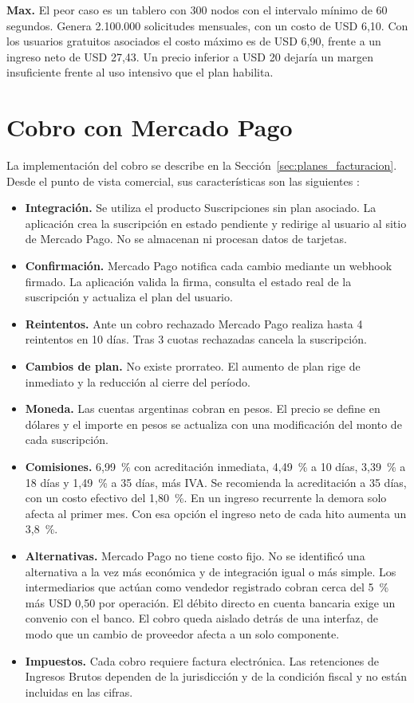 \textbf{Max.} El peor caso es un tablero con 300 nodos con el intervalo mínimo de 60 segundos. Genera 2.100.000 solicitudes mensuales, con un costo de USD 6,10. Con los usuarios gratuitos asociados el costo máximo es de USD 6,90, frente a un ingreso neto de USD 27,43. Un precio inferior a USD 20 dejaría un margen insuficiente frente al uso intensivo que el plan habilita.

\section{Cobro con Mercado Pago}
\label{sec:cobro_mp}
La implementación del cobro se describe en la Sección~\ref{sec:planes_facturacion}. Desde el punto de vista comercial, sus características son las siguientes \cite{mercadopago_docs, mercadopago_costos}:

\begin{itemize}
  \item \textbf{Integración.} Se utiliza el producto Suscripciones sin plan asociado. La aplicación crea la suscripción en estado pendiente y redirige al usuario al sitio de Mercado Pago. No se almacenan ni procesan datos de tarjetas.
  \item \textbf{Confirmación.} Mercado Pago notifica cada cambio mediante un webhook firmado. La aplicación valida la firma, consulta el estado real de la suscripción y actualiza el plan del usuario.
  \item \textbf{Reintentos.} Ante un cobro rechazado Mercado Pago realiza hasta 4 reintentos en 10 días. Tras 3 cuotas rechazadas cancela la suscripción.
  \item \textbf{Cambios de plan.} No existe prorrateo. El aumento de plan rige de inmediato y la reducción al cierre del período.
  \item \textbf{Moneda.} Las cuentas argentinas cobran en pesos. El precio se define en dólares y el importe en pesos se actualiza con una modificación del monto de cada suscripción.
  \item \textbf{Comisiones.} 6,99~\% con acreditación inmediata, 4,49~\% a 10 días, 3,39~\% a 18 días y 1,49~\% a 35 días, más IVA. Se recomienda la acreditación a 35 días, con un costo efectivo del 1,80~\%. En un ingreso recurrente la demora solo afecta al primer mes. Con esa opción el ingreso neto de cada hito aumenta un 3,8~\%.
  \item \textbf{Alternativas.} Mercado Pago no tiene costo fijo. No se identificó una alternativa a la vez más económica y de integración igual o más simple. Los intermediarios que actúan como vendedor registrado cobran cerca del 5~\% más USD 0,50 por operación. El débito directo en cuenta bancaria exige un convenio con el banco. El cobro queda aislado detrás de una interfaz, de modo que un cambio de proveedor afecta a un solo componente.
  \item \textbf{Impuestos.} Cada cobro requiere factura electrónica. Las retenciones de Ingresos Brutos dependen de la jurisdicción y de la condición fiscal y no están incluidas en las cifras.
\end{itemize}

